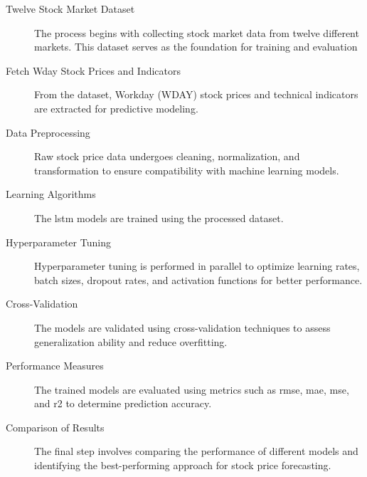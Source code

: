 \begin{description}
    \item[Twelve Stock Market Dataset] The process begins with collecting stock market data from
         twelve different markets. This dataset serves as the foundation for training and evaluation
    \item[Fetch Wday Stock Prices and Indicators]  From the dataset, Workday (WDAY) stock prices 
         and technical indicators are extracted for predictive modeling.
    \item[Data Preprocessing] Raw stock price data undergoes cleaning, normalization, and 
         transformation to ensure compatibility with machine learning models.
    \item[Learning Algorithms] The \acrshort{lstm} models are trained using the processed dataset.
    \item[Hyperparameter Tuning] Hyperparameter tuning is performed in parallel to optimize
        learning rates, batch sizes, dropout rates, and activation functions for better performance.
    \item[Cross-Validation] The models are validated using cross-validation techniques to assess 
         generalization ability and reduce overfitting.     
    \item[Performance Measures] The trained models are evaluated using metrics such as 
         \acrshort{rmse}, \acrshort{mae}, \acrshort{mse}, and \acrshort{r2} to determine 
         prediction accuracy.
    \item[Comparison of Results] The final step involves comparing the performance of 
         different models and identifying the best-performing approach for stock price forecasting.
\end{description}
